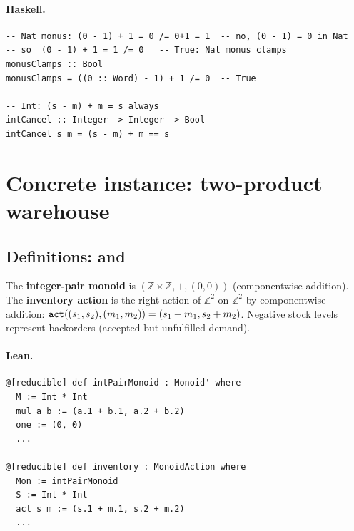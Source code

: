 \documentclass[11pt,a4paper]{article}
\begin{document}
\paragraph{Haskell.}
\begin{lstlisting}[style=haskell]
-- Nat monus: (0 - 1) + 1 = 0 /= 0+1 = 1  -- no, (0 - 1) = 0 in Nat
-- so  (0 - 1) + 1 = 1 /= 0   -- True: Nat monus clamps
monusClamps :: Bool
monusClamps = ((0 :: Word) - 1) + 1 /= 0  -- True

-- Int: (s - m) + m = s always
intCancel :: Integer -> Integer -> Bool
intCancel s m = (s - m) + m == s
\end{lstlisting}


\section{Concrete instance: two-product warehouse}

\subsection{Definitions:  and }

\begin{defn}
The \textbf{integer-pair monoid} is $(\mathbb{Z} \times \mathbb{Z}, +, (0,0))$
(componentwise addition).  The \textbf{inventory action} is the right action
of $\mathbb{Z}^2$ on $\mathbb{Z}^2$ by componentwise addition:
$\texttt{act}((s_1, s_2), (m_1, m_2)) = (s_1 + m_1, s_2 + m_2)$.
Negative stock levels represent backorders (accepted-but-unfulfilled demand).
\end{defn}

\paragraph{Lean.}
\begin{lstlisting}[style=lean]
@[reducible] def intPairMonoid : Monoid' where
  M := Int * Int
  mul a b := (a.1 + b.1, a.2 + b.2)
  one := (0, 0)
  ...

@[reducible] def inventory : MonoidAction where
  Mon := intPairMonoid
  S := Int * Int
  act s m := (s.1 + m.1, s.2 + m.2)
  ...
\end{lstlisting}
\end{document}
